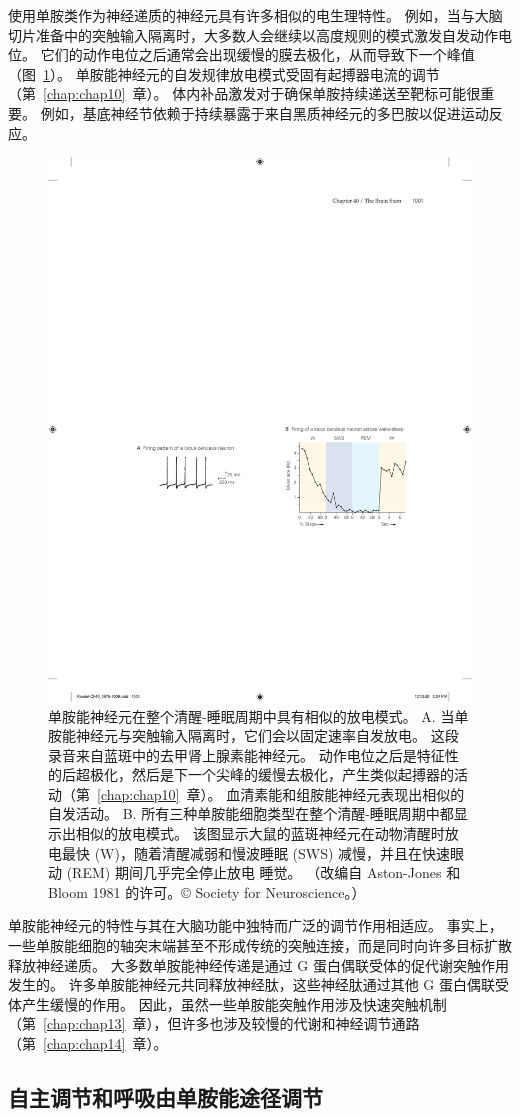 使用单胺类作为神经递质的神经元具有许多相似的电生理特性。
例如，当与大脑切片准备中的突触输入隔离时，大多数人会继续以高度规则的模式激发自发动作电位。
它们的动作电位之后通常会出现缓慢的膜去极化，从而导致下一个峰值（图~\ref{fig:40_12}）。
单胺能神经元的自发规律放电模式受固有起搏器电流的调节（第~\ref{chap:chap10}~章）。
体内补品激发对于确保单胺持续递送至靶标可能很重要。
例如，基底神经节依赖于持续暴露于来自黑质神经元的多巴胺以促进运动反应。


\begin{figure}[htbp]
	\centering
	\includegraphics[width=0.45\linewidth]{chap40/fig_40_12}
	\caption{单胺能神经元在整个清醒-睡眠周期中具有相似的放电模式。 A. 当单胺能神经元与突触输入隔离时，它们会以固定速率自发放电。 这段录音来自蓝斑中的去甲肾上腺素能神经元。 动作电位之后是特征性的后超极化，然后是下一个尖峰的缓慢去极化，产生类似起搏器的活动（第~\ref{chap:chap10}~章）。 血清素能和组胺能神经元表现出相似的自发活动。 B. 所有三种单胺能细胞类型在整个清醒-睡眠周期中都显示出相似的放电模式。 该图显示大鼠的蓝斑神经元在动物清醒时放电最快 (W)，随着清醒减弱和慢波睡眠 (SWS) 减慢，并且在快速眼动 (REM) 期间几乎完全停止放电 睡觉。 （改编自 Aston-Jones 和 Bloom 1981 的许可。© Society for Neuroscience。）}
	\label{fig:40_12}
\end{figure}


单胺能神经元的特性与其在大脑功能中独特而广泛的调节作用相适应。
事实上，一些单胺能细胞的轴突末端甚至不形成传统的突触连接，而是同时向许多目标扩散释放神经递质。
大多数单胺能神经传递是通过 G 蛋白偶联受体的促代谢突触作用发生的。
许多单胺能神经元共同释放神经肽，这些神经肽通过其他 G 蛋白偶联受体产生缓慢的作用。
因此，虽然一些单胺能突触作用涉及快速突触机制（第~\ref{chap:chap13}~章），但许多也涉及较慢的代谢和神经调节通路（第~\ref{chap:chap14}~章）。



\subsection{自主调节和呼吸由单胺能途径调节}


